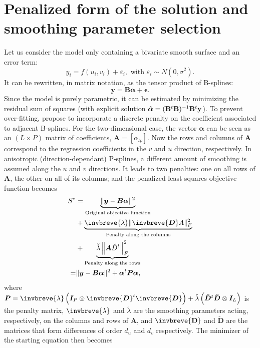 \section{Penalized form of the solution and smoothing parameter selection}
\label{appendix:SpATS_add_comput_info}
Let us consider the model only containing a bivariate smooth surface and an error term:
\[
	    y _ { i } = f \left( u _ { i } , v _ { i } \right) + \varepsilon _ { i } , \text { with } \varepsilon _ { i } \sim N 
	    \left( 0 , \sigma ^ { 2 } \right) \text{.} 
	    \]
It can be rewritten, in matrix notation, as the tensor product of B-splines:
\[
    \boldsymbol{y} = \boldsymbol{B}\boldsymbol{\alpha} + \boldsymbol{\epsilon}
    \text{.}
\]
Since the model is purely parametric, it can be estimated by minimizing the residual sum of squares (with explicit solution $\Hat{\boldsymbol{\alpha}} = (\mathbf{B}^t\mathbf{B})^{-1}\mathbf{B}^t\mathbf{y}$). To prevent over-fitting, \textcite{eilers_flexible_1996} propose to incorporate a discrete penalty on the coefficient associated to adjacent B-splines. For the two-dimensional case, the vector $\boldsymbol{\alpha}$ can be seen as an  $(L \times P)$  matrix  of  coefficients, $\mathbf{A}=[\alpha_{lp}]$. Now the rows  and columns of $\mathbf{A}$ correspond to the regression coefficients in the $v$ and  $u$ direction, respectively. In anisotropic (direction-dependant) P-splines, a different amount of smoothing is assumed along the $u$ and $v$ directions. It leads to two penalties:  one on all rows of $\mathbf{A}$,  the other on all of its columns; and the penalized least squares objective function becomes \parencite{eilers_multivariate_2003}
\[
\begin{aligned}
    S^{*} & = \underbrace{\|\boldsymbol{y}-\boldsymbol{B} \boldsymbol{\alpha}\|^{2}}_{\text{Original objective function}} \\
    	  & +\underbrace{\invbreve{\lambda}\|\invbreve{\boldsymbol{D}} A\|_{F}^{2}}_{\text{Penalty along the columns}} \\
    	  & +\underbrace{\breve{\lambda}\left\|\boldsymbol{A} \breve{D}^{t}\right\|_{F}^{2}}_{\text{Penalty along the rows}} \\
    =	  & \|\boldsymbol{y}-\boldsymbol{B} \boldsymbol{\alpha}\|^{2}+\boldsymbol{\alpha}^{t} \boldsymbol{P} \boldsymbol{\alpha}
    \text{,}
\end{aligned}
\]
where $\boldsymbol{P}=\invbreve{\lambda}\left(\boldsymbol{I}_{P} \otimes \invbreve{\boldsymbol{D}}^{t} \invbreve{\boldsymbol{D}}\right)+\breve{\lambda}\left(\breve{\boldsymbol{D}}^{t} \breve{\boldsymbol{D}} \otimes \boldsymbol{I}_{L}\right)$ is the penalty matrix, $\invbreve{\lambda}$ and $\breve{\lambda}$ are the smoothing parameters acting, respectively, on the columns and rows of $\mathbf{A}$, and $\invbreve{\mathbf{D}}$ and $\breve{\mathbf{D}}$ are the matrices that form differences of order $d_u$ and $d_v$ respectively. The minimizer of the starting equation then becomes 
